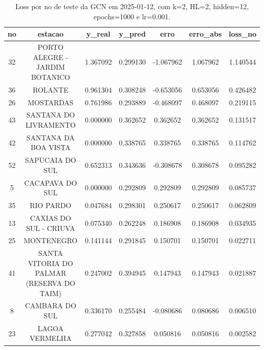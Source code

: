 \begin{table}[h]
\centering
\caption{Loss por no de teste da GCN em 2025-01-12, com k=2, HL=2, hidden=12, epochs=1000 e lr=0.001.}
\label{tab:gcn_loss_k2_hl2_h12_e1000_d20250112}
\begin{tabular}{ccccccc}
\toprule
no & estacao & y\_real & y\_pred & erro & erro\_abs & loss\_no \\
\midrule
32 & PORTO ALEGRE - JARDIM BOTANICO & 1.367092 & 0.299130 & -1.067962 & 1.067962 & 1.140544 \\
36 & ROLANTE & 0.961304 & 0.308248 & -0.653056 & 0.653056 & 0.426482 \\
26 & MOSTARDAS & 0.761986 & 0.293889 & -0.468097 & 0.468097 & 0.219115 \\
43 & SANTANA DO LIVRAMENTO & 0.000000 & 0.362652 & 0.362652 & 0.362652 & 0.131517 \\
42 & SANTANA DA BOA VISTA & 0.000000 & 0.338765 & 0.338765 & 0.338765 & 0.114762 \\
52 & SAPUCAIA DO SUL & 0.652313 & 0.343636 & -0.308678 & 0.308678 & 0.095282 \\
5 & CACAPAVA DO SUL & 0.000000 & 0.292809 & 0.292809 & 0.292809 & 0.085737 \\
35 & RIO PARDO & 0.047684 & 0.298301 & 0.250617 & 0.250617 & 0.062809 \\
13 & CAXIAS DO SUL - CRIUVA & 0.075340 & 0.262248 & 0.186908 & 0.186908 & 0.034935 \\
25 & MONTENEGRO & 0.141144 & 0.291845 & 0.150701 & 0.150701 & 0.022711 \\
41 & SANTA VITORIA DO PALMAR (RESERVA DO TAIM) & 0.247002 & 0.394945 & 0.147943 & 0.147943 & 0.021887 \\
8 & CAMBARA DO SUL & 0.336170 & 0.255484 & -0.080686 & 0.080686 & 0.006510 \\
23 & LAGOA VERMELHA & 0.277042 & 0.327858 & 0.050816 & 0.050816 & 0.002582 \\
\bottomrule
\end{tabular}
\end{table}
